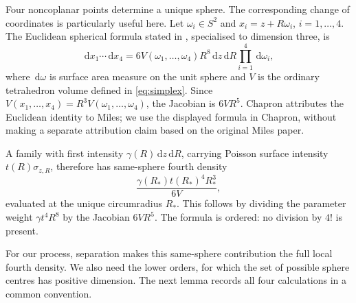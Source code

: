\documentclass[11pt,a4paper]{article}
\numberwithin{equation}{section}
\theoremstyle{definition}
\theoremstyle{remark}
\newcommand{\dd}{\,\mathrm d}
\begin{document}
Four noncoplanar points determine a unique sphere. The corresponding
change of coordinates is particularly useful here. Let $\omega_i\in S^2$
and $x_i=z+R\omega_i$, $i=1,\ldots,4$. The Euclidean spherical formula
stated in \cite[equation (1)]{Chapron2018}, specialised to dimension three,
is
\begin{equation}
 \dd x_1\cdots\dd x_4
 =6V(\omega_1,\ldots,\omega_4)R^8
       \dd z\dd R\prod_{i=1}^4\dd\omega_i,
 \label{eq:chapron}
\end{equation}
where $\dd\omega$ is surface area measure on the unit sphere and
$V$ is the ordinary tetrahedron volume defined in \eqref{eq:simplex}. Since
$V(x_1,\ldots,x_4)=R^3V(\omega_1,\ldots,\omega_4)$, the Jacobian
is $6VR^5$. Chapron attributes the Euclidean identity to Miles; we use
the displayed formula in Chapron, without making a separate attribution
claim based on the original Miles paper.

A family with first intensity $\gamma(R)\dd z\dd R$, carrying Poisson
surface intensity $t(R)\sigma_{z,R}$, therefore has same-sphere fourth
density
\begin{equation}
 \frac{\gamma(R_*)t(R_*)^4R_*^3}{6V},
 \label{eq:generic-fourth}
\end{equation}
evaluated at the unique circumradius $R_*$. This follows by dividing
the parameter weight $\gamma t^4R^8$ by the Jacobian $6VR^5$.
The formula is ordered: no division by $4!$ is present.

For our process, separation makes this same-sphere contribution the full
local fourth density. We also need the lower orders, for which the set of
possible sphere centres has positive dimension. The next lemma records
all four calculations in a common convention.
\end{document}
